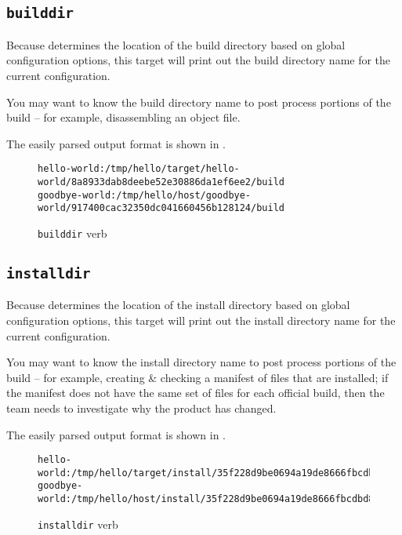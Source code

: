 \subsection{\texttt{builddir}}

Because \lmsbw determines the location of the build directory based on
global configuration options, this target will print out the build
directory name for the current configuration.

You may want to know the build directory name to post process portions
of the build -- for example, disassembling an object file.

The easily parsed output format is shown in
.

\begin{figure}[tbh]
\hrulefill
\begin{scriptsize}
\begin{verbatim}
hello-world:/tmp/hello/target/hello-world/8a8933dab8deebe52e30886da1ef6ee2/build
goodbye-world:/tmp/hello/host/goodbye-world/917400cac32350dc041660456b128124/build
\end{verbatim}
\end{scriptsize}
\hrulefill
\caption{\texttt{builddir} verb}\label{usinglmsbw:builddir-verb}
\end{figure}

\subsection{\texttt{installdir}}

Because \lmsbw determines the location of the install directory based
on global configuration options, this target will print out the
install directory name for the current configuration.

You may want to know the install directory name to post process
portions of the build -- for example, creating \& checking a manifest
of files that are installed; if the manifest does not have the same
set of files for each official build, then the \bni team needs to
investigate why the product has changed.

The easily parsed output format is shown in
.

\begin{figure}[tbh]
\hrulefill
\begin{footnotesize}
\begin{verbatim}
hello-world:/tmp/hello/target/install/35f228d9be0694a19de8666fbcdbd80d
goodbye-world:/tmp/hello/host/install/35f228d9be0694a19de8666fbcdbd80d
\end{verbatim}
\end{footnotesize}
\hrulefill
\caption{\texttt{installdir} verb}\label{usinglmsbw:installdir-verb}
\end{figure}

